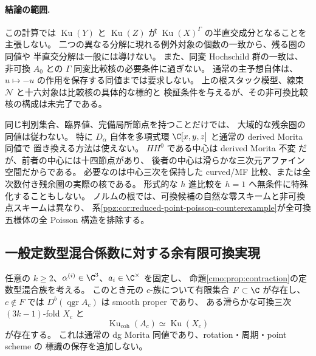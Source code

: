 \paragraph{結論の範囲.}
この計算では $\operatorname{Ku}(Y)$ と $\operatorname{Ku}(Z)$ が
$\operatorname{Ku}(X)^\Gamma$ の半直交成分となることを主張しない。
二つの異なる分解に現れる例外対象の個数の一致から、残る圏の同値や
半直交分解は一般には導けない。
また、同変 Hochschild 群の一致は、非可換 $A_0$ との
$\Gamma$ 同変比較核の必要条件に過ぎない。
通常の主予想自体は、$u\mapsto-u$ の作用を保存する同値までは要求しない。
上の根スタック模型、線束 $\mathcal N$ と十六対象は比較核の具体的な標的と
検証条件を与えるが、その非可換比較核の構成は未完了である。

\begin{remark}[比較の残る入力]
同じ判別集合、臨界値、完備局所節点を持つことだけでは、
大域的な残余圏の同値は従わない。
特に $D_\alpha$ 自体を多項式環 $\C[x,y,z]$ と通常の derived Morita 同値で
置き換える方法は使えない。
$HH^0$ である中心は derived Morita 不変
\cite[\S3.2]{CMOKellerHochschild}だが、前者の中心には十四節点があり、
後者の中心は滑らかな三次元アファイン空間だからである。
必要なのは中心三次を保持した curved/MF 比較、または全次数付き残余圏の実際の核である。
形式的な $h$ 進比較を $h=1$ へ無条件に特殊化することもしない。
ノルムの根では、可換候補の自然な零スキームと非可換点スキームは異なり、
系\ref{ppz:cor:reduced-point-poisson-counterexample}が全可換五様体の全 Poisson 構造を排除する。
\end{remark}

\subsection{一般定数型混合係数に対する余有限可換実現}

\begin{corollary}[定数型混合族の余有限可換実現]
\label{cmo:cor:cofinite}
任意の $k\ge2$、$\alpha^{(i)}\in\C^3$、$a_i\in\C^\times$ を固定し、
命題\ref{cmo:prop:contraction}の定数型混合族を考える。
このとき元の $c$-族について有限集合 $F\subset\C$ が存在し、
$c\notin F$ では $D^b(\operatorname{qgr}A_c)$ は smooth proper であり、
ある滑らかな可換三次 $(3k-1)$-fold $X_c$ と
\[
 \operatorname{Ku}_{\mathrm{coh}}(A_c)
             \simeq\operatorname{Ku}(X_c)
\]
が存在する。
これは通常の dg Morita 同値であり、rotation・周期・point scheme の
標識の保存を追加しない。
\end{corollary}


